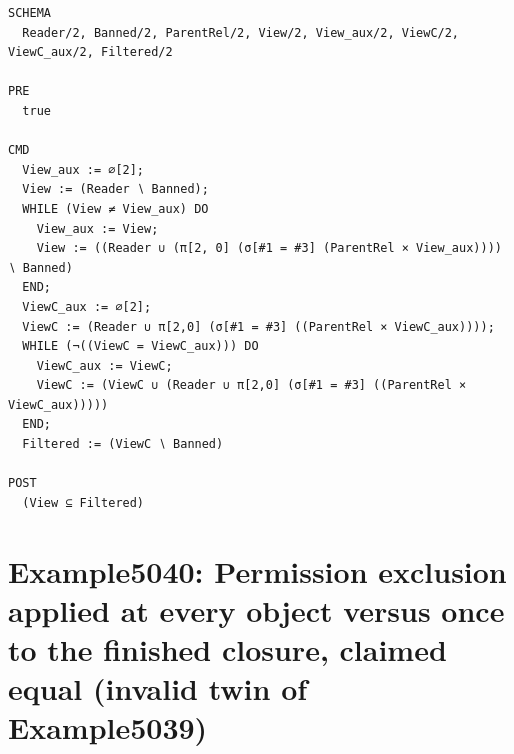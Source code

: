 \documentclass[10pt]{article}
\begin{document}
\begin{Verbatim}[fontsize=\scriptsize,breaklines=true,breakanywhere=true,frame=single,framesep=1.5mm]
SCHEMA
  Reader/2, Banned/2, ParentRel/2, View/2, View_aux/2, ViewC/2, ViewC_aux/2, Filtered/2

PRE
  true

CMD
  View_aux := ∅[2];
  View := (Reader ∖ Banned);
  WHILE (View ≠ View_aux) DO
    View_aux := View;
    View := ((Reader ∪ (π[2, 0] (σ[#1 = #3] (ParentRel × View_aux)))) ∖ Banned)
  END;
  ViewC_aux := ∅[2];
  ViewC := (Reader ∪ π[2,0] (σ[#1 = #3] ((ParentRel × ViewC_aux))));
  WHILE (¬((ViewC = ViewC_aux))) DO
    ViewC_aux := ViewC;
    ViewC := (ViewC ∪ (Reader ∪ π[2,0] (σ[#1 = #3] ((ParentRel × ViewC_aux)))))
  END;
  Filtered := (ViewC ∖ Banned)

POST
  (View ⊆ Filtered)
\end{Verbatim}

\Needspace{0.45\textheight}

\section{Example5040: Permission exclusion applied at every object versus once to the finished closure, claimed equal (invalid twin of Example5039)}\label{case:Example5040}
\end{document}
